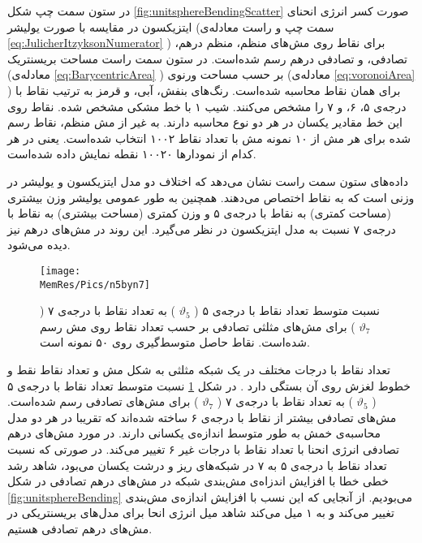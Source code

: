 در ستون سمت چپ شکل 
\ref{fig:unitsphereBendingScatter}
صورت کسر انرژی انحنای ایتزیکسون در مقایسه با صورت یولیشر (سمت چپ و راست معادله‌ی 
\ref{eq:JulicherItzyksonNumerator}
) برای نقاط روی مش‌های منظم، منظم درهم، تصادفی، و تصادفی درهم رسم شده‌است. در ستون سمت راست مساحت بریسنتریک (معادله‌ی 
\ref{eq:BarycentricArea}
) بر حسب مساحت ورنوی (معادله‌ی
\ref{eq:voronoiArea}
) برای همان نقاط محاسبه شده‌است. رنگ‌های بنفش، آبی،‌ و قرمز به ترتیب نقاط با درجه‌ی ۵، ۶، و ۷  را مشخص می‌کنند. شیب ۱ با خط مشکی مشخص شده. نقاط روی این خط مقادیر یکسان در هر دو نوع محاسبه دارند. به غیر از مش منظم،‌ نقاط رسم شده برای هر مش از ۱۰ نمونه مش با تعداد نقاط ۱۰۰۲ انتخاب شده‌است. یعنی در هر کدام از نمودارها ۱۰۰۲۰ نقطه نمایش داده شده‌است.

داده‌های ستون سمت راست نشان می‌دهد که اختلاف دو مدل ایتزیکسون و یولیشر  در  وزنی است که به نقاط اختصاص می‌دهند. همچنین به طور عمومی یولیشر وزن بیشتری (مساحت کمتری) به نقاط با درجه‌ی ۵ و وزن کمتری (مساحت بیشتری) به نقاط با درجه‌ی ۷ نسبت به مدل ایتزیکسون در نظر می‌گیرد. این روند در مش‌های درهم نیز دیده می‌شود.

\begin{figure}[htbp]
\begin{center}
\texttt{[image: \\MemRes/Pics/n5byn7]}
\caption{
نسبت متوسط تعداد نقاط با درجه‌ی ۵ (
$\vartheta_5$
) به تعداد نقاط با درجه‌ی ۷ (
$\vartheta_7$
) برای مش‌های مثلثی تصادفی بر حسب تعداد نقاط روی مش رسم شده‌است. نقاط حاصل متوسط‌گیری روی ۵۰ نمونه است.
}
\label{fig:n5n7}
\end{center}
\end{figure}


تعداد نقاط با درجات مختلف در یک شبکه مثلثی به شکل مش و تعداد نقاط نقط و خطوط لغزش روی آن بستگی دارد 
\cite{Nelson2000PRB}
. در شکل
\ref{fig:n5n7}
نسبت متوسط تعداد نقاط با درجه‌ی ۵ (
$\vartheta_5$
) به تعداد نقاط با درجه‌ی ۷ (
$\vartheta_7$
) برای مش‌های تصادفی رسم شده‌است. مش‌های تصادفی بیشتر از نقاط با درجه‌ی ۶ ساخته شده‌اند که تقریبا در هر دو مدل محاسبه‌ی خمش به طور متوسط اندازه‌ی یکسانی دارند. در مورد مش‌های درهم تصادفی انرژی انحنا با تعداد نقاط با درجات غیر ۶ تغییر می‌کند. در صورتی که نسبت تعداد نقاط با درجه‌ی ۵ به ۷ در شبکه‌های ریز و درشت یکسان می‌بود، شاهد رشد خطی خطا با افزایش اندزاه‌ی مش‌بندی شبکه‌ در مش‌های درهم تصادفی در شکل 
\ref{fig:unitsphereBending}
می‌بودیم. از آنجایی که این نسب با افزایش اندازه‌ی مش‌بندی تغییر می‌کند و به ۱ میل می‌کند شاهد میل‌ انرژی انحا برای مدل‌های بریسنتریکی در مش‌های درهم تصادفی هستیم.



